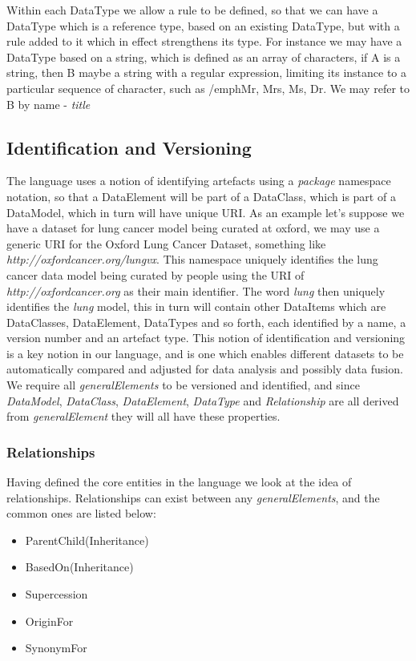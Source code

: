 \documentclass{llncs}
\begin{document}
	Within each DataType we allow a rule to be defined, so that we can have a DataType which is a reference type, based on an existing DataType, but with a rule added to it which in effect strengthens its type. For instance we may have a DataType based on a string, which is defined as an array of characters, if A is a string, then B maybe a string with a regular expression, limiting its instance to a particular sequence of character, such as /emph{Mr, Mrs, Ms, Dr}. We may refer to B by name - \emph{title} 
	
	\subsection{Identification and Versioning}
	The language uses a notion of identifying artefacts using a \emph{package} namespace notation, so that a DataElement will be part of a DataClass, which is part of a DataModel, which in turn will have unique URI. As an example let's suppose we have a dataset for lung cancer model being curated at oxford, we may use a generic URI for the Oxford Lung Cancer Dataset, something like \emph{http://oxfordcancer.org/lungvx}. This namespace uniquely identifies the lung cancer data model being curated by people using the URI of \emph{http://oxfordcancer.org} as their main identifier. The word \emph{lung} then uniquely identifies the \emph{lung} model, this in turn will contain other DataItems which are DataClasses, DataElement, DataTypes and so forth, each identified by a name, a version number and an artefact type.
	This notion of identification and versioning is a key notion in our language, and is one which enables different datasets to be automatically compared and adjusted for data analysis and possibly data fusion. We require all \emph{generalElements} to be versioned and identified, and since \emph{DataModel}, \emph{DataClass}, \emph{DataElement}, \emph{DataType} and \emph{Relationship} are all derived from \emph{generalElement} they will all have these properties. 
	
	\subsubsection{Relationships}
	
	Having defined the core entities in the language we look at the idea of relationships. Relationships can exist between any \emph{generalElements}, and the common ones are listed below:
	
	\begin{itemize}
		\item ParentChild(Inheritance)
		\item BasedOn(Inheritance)
		\item Supercession
		\item OriginFor
		\item SynonymFor
	\end{itemize}
	
\end{document}
